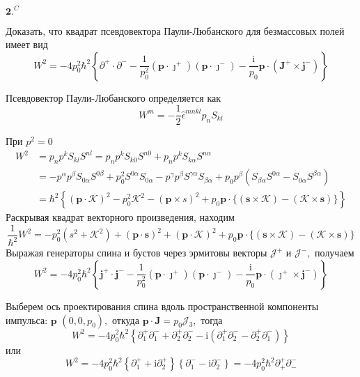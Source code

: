 \documentclass[a4paper,12pt]{article} %
\begin{document}
\begin{ttask}$\mathbf{2 .}^{C}$ 

Доказать, что квадрат псевдовектора Паули-Любанского для безмассовых полей имеет вид
$$
W^{2}=-4 p_{0}^{2} \hbar^{2}\left\{
\partial^{+} \cdot \partial^{-}-
\frac{1}{p_{0}^{2}}\left(\boldsymbol{p} \cdot \boldsymbol{\jmath}^{+}\right)\left(\boldsymbol{p} \cdot \boldsymbol{\jmath}^{-}\right)-
\frac{\mathrm{i}}{p_{0}} \boldsymbol{p} \cdot\left(\boldsymbol{J}^{+} \times \boldsymbol{j}^{-}\right)
\right\}$$






Псевдовектор Паули-Любанского определяется как
$$
W^{m}=-\frac{1}{2} \hat{\epsilon}^{m n k l} p_{n} S_{k l}
$$


При $p^{2}=0$
$$
\begin{aligned}
	W^{2} &=
	p_{n} p^{k} S_{k l} S^{n l}=p_{n} p^{k} S_{k 0} S^{n 0}+p_{n} p^{k} S_{k \alpha} S^{n \alpha} \\
	&=-p^{\alpha} p^{\beta} S_{0 \alpha} S^{0 \beta}+p_{0}^{2} S^{0 \alpha} S_{0 \alpha}-p^{\gamma} p^{\beta} S^{\gamma \alpha} S_{\beta \alpha}+p_{0} p^{\beta}\left(S_{\beta \alpha} S^{0 \alpha}-S_{0 \alpha} S^{\beta \alpha}\right) \\
	&=\hbar^{2}\left\{(\boldsymbol{p} \cdot \mathcal{K})^{2}-p_{0}^{2} \mathcal{K}^{2}-(\boldsymbol{p} \times s)^{2}+p_{0} \boldsymbol{p} \cdot\{(\boldsymbol{s} \times \mathcal{K})-(\mathcal{K} \times \boldsymbol{s})\}
	\right\}
\end{aligned}
$$
Раскрывая квадрат векторного произведения, находим
$$
\frac{1}{\hbar^{2}} W^{2}=-p_{0}^{2}\left(s^{2}+\mathcal{K}^{2}\right)+(\boldsymbol{p} \cdot \boldsymbol{s})^{2}+(\boldsymbol{p} \cdot \boldsymbol{\mathcal { K }})^{2}+p_{0} \boldsymbol{p} \cdot\{(\boldsymbol{s} \times \mathcal{K})-(\mathcal{K} \times \boldsymbol{s})\}
$$
Выражая генераторы спина и бустов через эрмитовы векторы $\mathcal{J}^{+}$ и $\mathcal{J}^{-},$ получаем
$$
W^{2}=-4 p_{0}^{2} \hbar^{2}\left\{
\boldsymbol{j}^{+} \cdot \boldsymbol{j}^{-}-
\frac{1}{p_{0}^{2}}\left(\boldsymbol{p} \cdot \boldsymbol{\jmath}^{+}\right)\left(\boldsymbol{p} \cdot \boldsymbol{\jmath}^{-}\right)-
\frac{\mathrm{i}}{p_{0}} \boldsymbol{p} \cdot\left(\boldsymbol{\jmath}^{+} \times \boldsymbol{j}^{-}\right)
\right\}
$$




Выберем ось проектирования спина вдоль пространственной компоненты импульса: $\boldsymbol{p}$ $\left(0,0, p_{0}\right),$ откуда $\boldsymbol{p} \cdot \boldsymbol{J}=p_{0} \mathcal{J}_{3},$ тогда
$$
W^{2}=-4 p_{0}^{2} \hbar^{2}\left\{\partial_{1}^{+} \partial_{1}^{-}+\partial_{2}^{+} \partial_{2}^{-}-\mathrm{i}\left(\partial_{1}^{+} \partial_{2}^{-}-\partial_{2}^{+} \partial_{1}^{-}\right)\right\}
$$
или
$$
W^{2}=-4 p_{0}^{2} \hbar^{2}\left\{
\partial_{1}^{+}+\mathrm{i} \partial_{2}^{+}\right\}\left\{\partial_{1}^{-}-\mathrm{i} \partial_{2}^{-}\right\}=-4 p_{0}^{2} \hbar^{2} \partial_{+}^{+} \partial_{-}^{-}
$$



\end{ttask}
\end{document}
